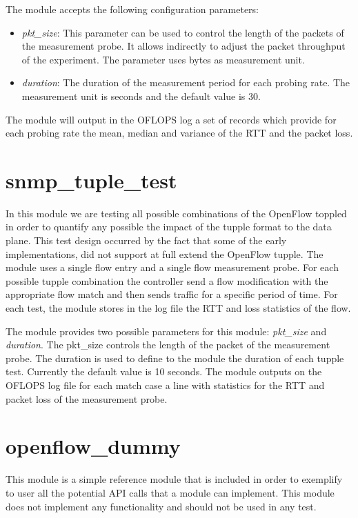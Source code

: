 \documentclass{book}
\begin{document}
The module accepts the following configuration parameters:
\begin{itemize}
    \item \emph{pkt\_size}: This parameter can be used to control the length of the
        packets of the measurement probe. It allows indirectly to adjust the packet
        throughput of the experiment. The parameter uses bytes as measurement unit.
    \item \emph{duration}: The duration of the measurement period for each probing
        rate. The measurement unit is seconds and the default value is 30. 
\end{itemize}

The module will output in the OFLOPS log a set of records which provide for each
probing rate the mean, median and variance of the RTT and the packet loss. 

\section{snmp\_tuple\_test}

In this module we are testing all possible combinations of the OpenFlow toppled in
order to quantify any possible the impact of the tupple format to the data plane. This test
design occurred by the fact that some of the early implementations, did not
support at full extend the OpenFlow tupple. The module uses a single flow entry
and a single flow measurement probe. For each possible tupple combination the
controller send a flow modification with the appropriate flow match and then
sends traffic for a specific period of time. For each test, the module stores in the
log file the RTT and loss statistics of the flow. 

The module provides two possible parameters for this module: \emph{pkt\_size}
and \emph{duration}. The pkt\_size controls the length of the packet of the
measurement probe. The duration is used to define to the module the duration of
each tupple test. Currently the default value is 10 seconds. The module
outputs on the OFLOPS log file for each match case a line with statistics for
the RTT and packet loss of the measurement probe.  

\section{openflow\_dummy}

This module is a simple reference module that is included in order to exemplify
to user all the potential API calls that a module can implement. This module
does not implement any functionality and should not be used in any test.
\end{document}
